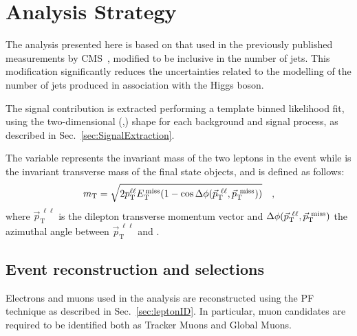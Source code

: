 \section{Analysis Strategy}
\label{sec:AnalysisStrategy}

The analysis presented here is based on that used in the previously published \hwwllnn
measurements by CMS~\cite{Chatrchyan:2013iaa}, modified to be inclusive in the number of jets. 
This modification significantly reduces the uncertainties related to the modelling of the number of jets produced in association with the Higgs boson.

The signal contribution is extracted performing a template binned likelihood fit, using the two-dimensional (\mll,\mt) shape for each background and signal process, as described in Sec.~\ref{sec:SignalExtraction}.

The \mll variable represents the invariant mass of the two leptons in the event while \mt is the invariant transverse mass of the final state objects, and is defined as follows:
\begin{equation}
m_\mathrm{T} = \sqrt{2p_\mathrm{T}^{\ell\ell}E_\mathrm{T}^\mathrm{\,miss}(1-\cos\Delta\phi(\vec{p}_\mathrm{T}^{~\ell\ell},\vec{p}_\mathrm{T}^\mathrm{~miss}))} \quad ,
\end{equation}
\noindent where $\vec{p}_\mathrm{T}^{~\ell\ell}$ is the dilepton transverse momentum vector and $\Delta\phi(\vec{p}_\mathrm{T}^{~\ell\ell},\vec{p}_\mathrm{T}^\mathrm{~miss})$ the azimuthal angle between $\vec{p}_\mathrm{T}^{~\ell\ell}$ and \ptmiss.

\subsection{Event reconstruction and selections}\label{sec:Selections}

Electrons and muons used in the analysis are reconstructed using the PF technique as described in Sec.~\ref{sec:leptonID}. In particular, muon candidates are required to be identified both as Tracker Muons and Global Muons.

